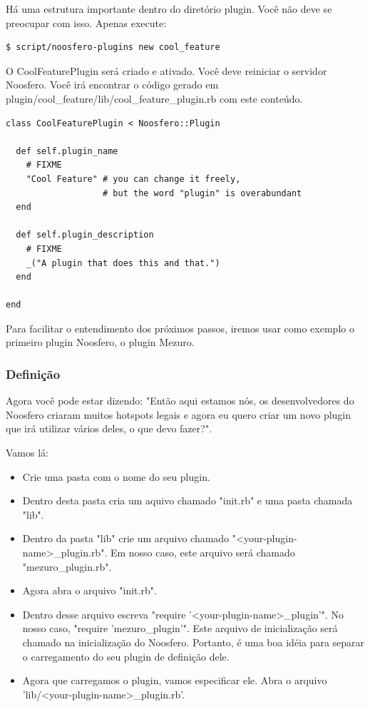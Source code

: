 \documentclass[11pt]{article}
\begin{document}
Há uma estrutura importante dentro do diretório plugin. Você não deve se
preocupar com isso. Apenas execute:

\begin{Verbatim}[frame=single,fontfamily=courier]
$ script/noosfero-plugins new cool_feature
\end{Verbatim}

O CoolFeaturePlugin será criado e ativado. Você deve reiniciar o servidor
Noosfero. Você irá encontrar o código gerado em
plugin/cool\_feature/lib/cool\_feature\_plugin.rb com este conteúdo.

\begin{Verbatim}[frame=single,fontfamily=courier]
class CoolFeaturePlugin < Noosfero::Plugin
 
  def self.plugin_name
    # FIXME
    "Cool Feature" # you can change it freely,
                   # but the word "plugin" is overabundant
  end
 
  def self.plugin_description
    # FIXME
    _("A plugin that does this and that.")
  end
 
end
\end{Verbatim}

Para facilitar o entendimento dos próximos passos, iremos usar como exemplo o
primeiro plugin Noosfero, o plugin Mezuro.

\subsubsection{Definição}

Agora você pode estar dizendo: "Então aqui estamos nós, os desenvolvedores do
Noosfero criaram muitos hotspots legais e agora eu quero criar um novo plugin
que irá utilizar vários deles, o que devo fazer?".

Vamos lá:

\begin{itemize}
  \item Crie uma pasta com o nome do seu plugin.
  \item Dentro desta pasta cria um aquivo chamado "init.rb" e uma pasta
    chamada "lib".
  \item Dentro da pasta "lib" crie um arquivo chamado
    "<your-plugin-name>\_plugin.rb". Em nosso caso, este arquivo será chamado
    "mezuro\_plugin.rb".
  \item Agora abra o arquivo "init.rb".
  \item Dentro desse arquivo escreva "require '<your-plugin-name>\_plugin'".
    No nosso caso, "require 'mezuro\_plugin'". Este arquivo de inicialização
    será chamado na inicialização do Noosfero. Portanto, é uma boa idéia para
    separar o carregamento do seu plugin de definição dele.
  \item Agora que carregamos o plugin, vamos especificar ele. Abra o arquivo
    'lib/<your-plugin-name>\_plugin.rb'.
\end{itemize}
\end{document}
